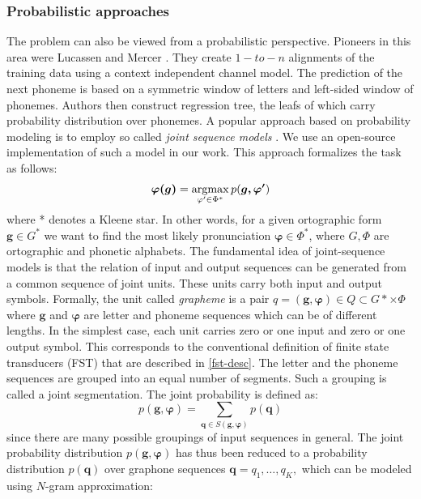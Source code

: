 \subsubsection{Probabilistic approaches}
The problem can also be viewed from a probabilistic perspective.
Pioneers in this area were Lucassen and Mercer \cite{lucassen1984information}.
They create $1-to-n$ alignments of the training data using a context independent channel model.
The prediction of the next phoneme is based on a symmetric window of letters and left-sided window of phonemes.
Authors then construct regression tree, the leafs of which carry probability distribution over phonemes.
\linebreak\linebreak
\label{g2p-jseq}
A popular approach based on probability modeling is to employ so called \textit{joint sequence models} \cite{bisani2008joint}.
We use an open-source implementation of such a model in our work.
This approach formalizes the task as follows:
\begin{equation}
\boldsymbol{\varphi(g)} = \operatorname*{argmax}_{\varphi'\in\Phi^*} p(\boldsymbol{g,\varphi'})
\end{equation}
where * denotes a Kleene star.
In other words, for a given ortographic form $\boldsymbol{g} \in G^*$ we want to find the most likely pronunciation $\boldsymbol{\varphi} \in \Phi^*$, where $G, \Phi$ are ortographic and phonetic alphabets.
The fundamental idea of joint-sequence models is that the relation of input and output sequences can be generated from a common sequence of joint units.
These units carry both input and output symbols.
Formally, the unit called \textit{grapheme} is a pair $q = (\mathbf{g}, \mathbf{\varphi}) \in Q \subset G* \times \Phi$ where $\mathbf{g}$ and $\mathbf{\varphi}$ are letter and phoneme sequences which can be of different lengths.
In the simplest case, each unit carries zero or one input and zero or one output symbol.
This corresponds to the conventional definition of finite state transducers (FST) that are described in \ref{fst-desc}.
The letter and the phoneme sequences are grouped into an equal number of segments.
Such a grouping is called a joint segmentation.
The joint probability is defined as:
\begin{equation}
p(\mathbf{g}, \mathbf{\varphi}) = \sum_{\mathbf{q}\in S(\mathbf{g},\mathbf{\varphi})}p(\mathbf{q})
\end{equation}
since there are many possible groupings of input sequences in general.
The joint probability distribution $p(\mathbf{g}, \mathbf{\varphi})$ has thus been reduced to a probability distribution $p(\mathbf{q})$ over graphone sequences $\mathbf{q} = q_1, \dots, q_K,$ which can be modeled using  $N$-gram approximation:
